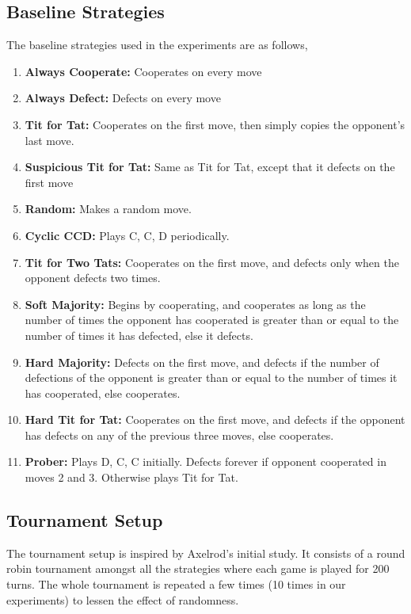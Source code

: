 \documentclass[a4paper]{article}
\begin{document}
	\subsection{Baseline Strategies}
	
	The baseline strategies used in the experiments are as follows,
	\begin{enumerate}
	
	\item \textbf{Always Cooperate:} Cooperates on every move
	\item \textbf{Always Defect:} Defects on every move
	\item \textbf{Tit for Tat:} Cooperates on the first move, then simply copies the opponent's last move.
	\item \textbf{Suspicious Tit for Tat:} Same as Tit for Tat, except that it defects on the first move
	\item \textbf{Random:} Makes a random move.
	\item \textbf{Cyclic CCD:} Plays C, C, D periodically.
	\item \textbf{Tit for Two Tats:} Cooperates on the first move, and defects only when the opponent defects two times.
	\item \textbf{Soft Majority:} Begins by cooperating, and cooperates as long as the number of times the opponent has
cooperated is greater than or equal to the number of times it has defected, else it defects.
	\item \textbf{Hard Majority:} Defects on the first move, and defects if the number of defections of the opponent is greater than or equal to the number of times it has cooperated, else cooperates.
	\item \textbf{Hard Tit for Tat:} Cooperates on the first move, and defects if the opponent has defects on any of the previous three moves, else cooperates.
	\item \textbf{Prober:} Plays D, C, C initially. Defects forever if opponent cooperated in moves 2 and 3. Otherwise plays Tit for Tat.	
	\end{enumerate}
	
	\subsection{Tournament Setup}
	
	The tournament setup is inspired by Axelrod's initial study. It consists of a round robin tournament amongst all the strategies where each game is played for 200 turns. The whole tournament is repeated a few times (10 times in our experiments) to lessen the effect of randomness.
\end{document}
